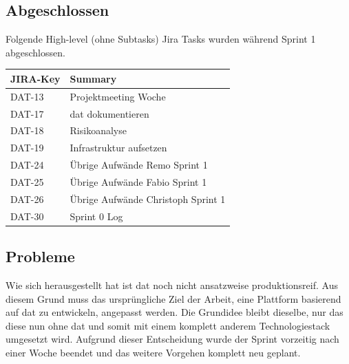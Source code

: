 \subsection*{Abgeschlossen}
Folgende High-level (ohne Subtasks) Jira Tasks wurden während Sprint 1 abgeschlossen.

\begin{table}[H]
\centering
\begin{tabular}{ll}
	\toprule
	\textbf{JIRA-Key} & \textbf{Summary}\\
	\midrule
	DAT-13 & Projektmeeting Woche \\
	DAT-17 & dat dokumentieren \\
	DAT-18 & Risikoanalyse \\
	DAT-19 & Infrastruktur aufsetzen \\
	DAT-24 & Übrige Aufwände Remo Sprint 1 \\
	DAT-25 & Übrige Aufwände Fabio Sprint 1 \\
	DAT-26 & Übrige Aufwände Christoph Sprint 1 \\
	DAT-30 & Sprint 0 Log\\
	\bottomrule
\end{tabular}	
\end{table}

\subsection*{Probleme}\label{sec:pm:sprint1-probleme}
Wie sich herausgestellt hat ist \gls{dat} noch nicht ansatzweise produktionsreif. Aus diesem Grund muss das ursprüngliche Ziel der Arbeit, eine Plattform basierend auf \gls{dat} zu entwickeln, angepasst werden. Die Grundidee bleibt dieselbe, nur das diese nun ohne \gls{dat} und somit mit einem komplett anderem Technologiestack umgesetzt wird. Aufgrund dieser Entscheidung wurde der Sprint vorzeitig nach einer Woche beendet und das weitere Vorgehen komplett neu geplant.